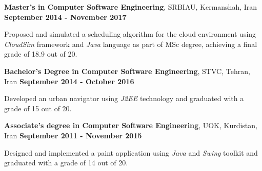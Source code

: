 
\begin{scholarship}
\scholarshipentry{}
{\textbf{Master's in Computer Software Engineering}, SRBIAU, Kermanshah, Iran \hspace{63 pt } \textbf{September 2014 - November 2017}

Proposed and simulated a scheduling algorithm for the cloud environment using \textit{CloudSim} framework and \textit{Java} language as part of MSc degree, achieving a final grade of 18.9 out of 20. \vspace{5 pt}
}
\scholarshipentry{}
				{\textbf{Bachelor's Degree in Computer Software Engineering}, STVC, Tehran, Iran \hspace{69 pt} \textbf{September 2014 - October 2016}
 
Developed an urban navigator using \textit{J2EE} technology and graduated with a grade of 15 out of 20. \vspace{5 pt}	
}		
\scholarshipentry{}
				{\textbf{Associate's degree in Computer Software Engineering}, UOK, Kurdistan, Iran \hspace{50 pt} \textbf{September 2011 - November 2015}
 
Designed and implemented a paint application using \textit{Java} and \textit{Swing} toolkit and graduated with a grade of 14 out of 20.
}
\end{scholarship}
